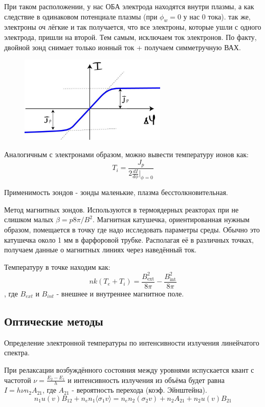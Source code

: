 \documentclass[10pt, a4paper]{article}
\begin{document}
При таком расположении, у нас ОБА электрода находятся внутри плазмы, а как следствие в одинаковом потенциале плазмы (при $\phi_w=0$ у нас 0 тока). так же, электроны оч лёгкие и так получается, что все электроны, которые ушли с одного электрода, пришли на второй. Тем самым, исключаем ток электронов. По факту, двойной зонд снимает только ионный ток + получаем симметручную ВАХ.
\begin{figure}[ht]
	\begin{center}
		\includegraphics[width=70mm]{VaH_zonda_2.JPG}
	\end{center}
\end{figure}
Аналогичным с электронами образом, можно вывести температуру ионов как:
\begin{equation}
	T_i= \frac{J_p}{2 \frac{d I}{d \phi} |_{\phi=0}}
\end{equation}

Применимость зондов - зонды маленькие, плазма бесстолкновительная.

Метод магнитных зондов.
Используются в термоядерных реакторах при не слишком малых $\beta=p8\pi/B^2$. Магнитная катушечка, ориентированная нужным образом, помещается в точку где надо исследовать параметры среды. Обычно это катушечка около 1 мм в фарфоровой трубке. Располагая её в различных точках, получаем данные о магнитных линиях через наведённый ток.

Температуру в точке находим как:
\begin{equation}
	n k(T_e + T_i)= \frac{B_{\text{ext}}^2}{8 \pi} - \frac{B_{\text{int}}^2}{8 \pi}
\end{equation}
, где $B_{ext}$ и $B_{int}$ - внешнее и внутреннее магнитное поле.
 

\subsection{Оптические методы} \label{subsec:optical_diagnostics}

Определение электронной температуры по интенсивности излучения линейчатого спектра.

При релаксации возбуждённого состояния между уровнями испускается квант с частотой $\nu=\frac{E_2-E_1}{h}$ и интенсивность излучения из объёма будет равна $I=h\nu n_{2} A_{21}$, где $A_{21}$ - вероятность перехода (коэф. Эйнштейна).
\begin{equation}
	n_1 u(v)B_{12}+n_e n_1 \langle\sigma_1 v\rangle=n_e n_2 (\sigma_2 v) + n_2 A_{21}+n_2 u(v) B_{21}
\end{equation}
\end{document}
